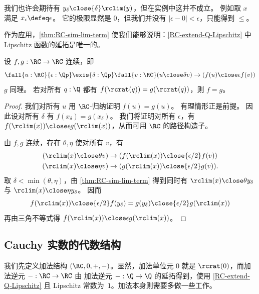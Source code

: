\begin{rmk}
  我们也许会期待有 $y_\delta \close{\delta} \rclim(y)$，但在实例中这并不成立。
  例如取 $x$ 满足 $x_\epsilon \defeq \epsilon$。
  它的极限显然是 $0$，但我们并没有 $|\epsilon - 0 |<\epsilon$，只能得到 $\le$。
\end{rmk}

作为应用，\cref{thm:RC-sim-lim-term} 使我们能够说明：\cref{RC-extend-Q-Lipschitz} 中 Lipschitz 函数的延拓是唯一的。

\begin{lem}\label{RC-continuous-eq}
  设 $f,g:\RC\to\RC$ 连续，即
  \[ \fall{u:\RC}{\epsilon:\Qp}\exis{\delta:\Qp}\fall{v:\RC} (u\close\delta v) \to (f(u) \close\epsilon f(v)) \]
  $g$ 同理。
  若对所有 $q:\Q$ 都有 $f(\rcrat(q))=g(\rcrat(q))$，则 $f=g$。
\end{lem}
\begin{proof}
  我们对所有 $u$ 用 $\RC$-归纳证明 $f(u)=g(u)$。
  有理情形正是前提。
  因此设对所有 $\delta$ 有 $f(x_\delta)=g(x_\delta)$。
  我们将证明对所有 $\epsilon$，有 $f(\rclim(x))\close\epsilon g(\rclim(x))$，从而可用 $\RC$ 的路径构造子。

  由 $f,g$ 连续，存在 $\theta,\eta$ 使对所有 $v$，有
  \begin{align*}
    (\rclim(x)\close\theta v) &\to (f(\rclim(x)) \close{\epsilon/2} f(v))\\
    (\rclim(x)\close\eta v) &\to (g(\rclim(x)) \close{\epsilon/2} g(v)).
  \end{align*}
  取 $\delta < \min(\theta,\eta)$，由 \cref{thm:RC-sim-lim-term} 得到同时有 $\rclim(x)\close\theta y_\delta$ 与 $\rclim(x)\close\eta y_\delta$。
  因而
  \[ f(\rclim(x)) \close{\epsilon/2} f(y_\delta) = g(y_\delta) \close{\epsilon/2} g(\rclim(x))\]
  再由三角不等式得 $f(\rclim(x))\close\epsilon g(\rclim(x))$。
\end{proof}

\subsection{Cauchy 实数的代数结构}
\label{sec:algebr-struct-cauchy}

我们先定义加法结构 $(\RC, 0, {+}, {-})$。显然，加法单位元
$0$ 就是 $\rcrat(0)$，而加法逆元 ${-} : \RC \to \RC$ 由
加法逆元 ${-} : \Q \to \Q$ 的延拓得到，使用 \cref{RC-extend-Q-Lipschitz}
且 Lipschitz 常数为~$1$。加法本身则需要多做一些工作。

